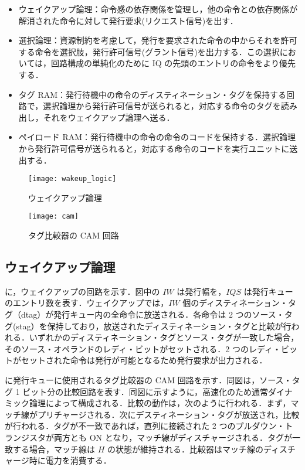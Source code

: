 \begin{itemize}
  \item ウェイクアップ論理：命令感の依存関係を管理し，他の命令との依存関係が解消された命令に対して発行要求(リクエスト信号)を出す．
  \item 選択論理：資源制約を考慮して，発行を要求された命令の中からそれを許可する命令を選択肢，発行許可信号(グラント信号)を出力する．この選択においては，回路構成の単純化のために IQ の先頭のエントリの命令をより優先する．
  \item タグ RAM：発行待機中の命令のディスティネーション・タグを保持する回路で，選択論理から発行許可信号が送られると，対応する命令のタグを読み出し，それをウェイクアップ論理へ送る．
  \item ペイロード RAM：発行待機中の命令の命令のコードを保持する．選択論理から発行許可信号が送られると，対応する命令のコードを実行ユニットに送出する． 
\end{itemize}

\begin{figure}[thb]
  \centering
  \texttt{[image: wakeup\_logic]}
  \caption{ウェイクアップ論理}
  \label{fig:wakeup_logic}
\end{figure}

\begin{figure}[htb]
  \texttt{[image: cam]}
  \caption{タグ比較器の CAM 回路}
  \label{fig:cam}
\end{figure}

\subsection{ウェイクアップ論理}
\label{sec:wakeup_logic}
に，ウェイクアップの回路を示す．図中の $IW$ は発行幅を，$IQS$ は発行キューのエントリ数を表す．ウェイクアップでは，$IW$ 個のディスティネーション・タグ（dtag）が発行キュー内の全命令に放送される．各命令は 2 つのソース・タグ(stag）を保持しており，放送されたディスティネーション・タグと比較が行われる．いずれかのディスティネーション・タグとソース・タグが一致した場合，そのソース・オペランドのレディ・ビットがセットされる．2 つのレディ・ビットがセットされた命令は発行が可能となるため発行要求が出力される．

に発行キューに使用されるタグ比較器の CAM 回路を示す．同図は，ソース・タグ 1 ビット分の比較回路を表す．同図に示すように，高速化のため通常ダイナミック論理によって構成される．比較の動作は，次のように行われる．まず，マッチ線がプリチャージされる．次にデスティネーション・タグが放送され，比較が行われる．タグが不一致であれば，直列に接続された 2 つのプルダウン・トランジスタが両方とも ON となり，マッチ線がディスチャージされる．タグが一致する場合，マッチ線は $H$ の状態が維持される．比較器はマッチ線のディスチャージ時に電力を消費する．


